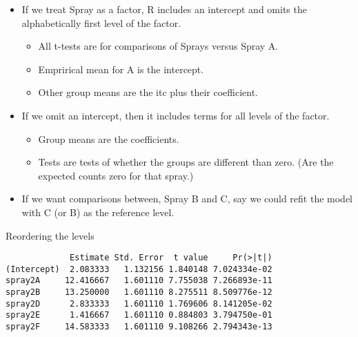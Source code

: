 \documentclass[12pt,]{04-class-files/abntex2}
\newenvironment{Shaded}{\begin{snugshade}}{\end{snugshade}}
\newcommand{\DataTypeTok}[1]{\textcolor[rgb]{0.13,0.29,0.53}{#1}}
\newcommand{\KeywordTok}[1]{\textcolor[rgb]{0.13,0.29,0.53}{\textbf{#1}}}
\newcommand{\NormalTok}[1]{#1}
\newcommand{\OperatorTok}[1]{\textcolor[rgb]{0.81,0.36,0.00}{\textbf{#1}}}
\newcommand{\StringTok}[1]{\textcolor[rgb]{0.31,0.60,0.02}{#1}}
\providecommand{\tightlist}{%
  \setlength{\itemsep}{0pt}\setlength{\parskip}{0pt}}
\begin{document}
\begin{itemize}
\tightlist
\item
  If we treat Spray as a factor, R includes an intercept and omits the alphabetically first level of the factor.

  \begin{itemize}
  \tightlist
  \item
    All t-tests are for comparisons of Sprays versus Spray A.
  \item
    Emprirical mean for A is the intercept.
  \item
    Other group means are the itc plus their coefficient.
  \end{itemize}
\item
  If we omit an intercept, then it includes terms for all levels of the factor.

  \begin{itemize}
  \tightlist
  \item
    Group means are the coefficients.
  \item
    Tests are tests of whether the groups are different than zero. (Are the expected counts zero for that spray.)
  \end{itemize}
\item
  If we want comparisons between, Spray B and C, say we could refit the model with C (or B) as the reference level.
\end{itemize}

Reordering the levels

\begin{Shaded}
\end{Shaded}

\begin{verbatim}
             Estimate Std. Error  t value     Pr(>|t|)
(Intercept)  2.083333   1.132156 1.840148 7.024334e-02
spray2A     12.416667   1.601110 7.755038 7.266893e-11
spray2B     13.250000   1.601110 8.275511 8.509776e-12
spray2D      2.833333   1.601110 1.769606 8.141205e-02
spray2E      1.416667   1.601110 0.884803 3.794750e-01
spray2F     14.583333   1.601110 9.108266 2.794343e-13
\end{verbatim}
\end{document}
